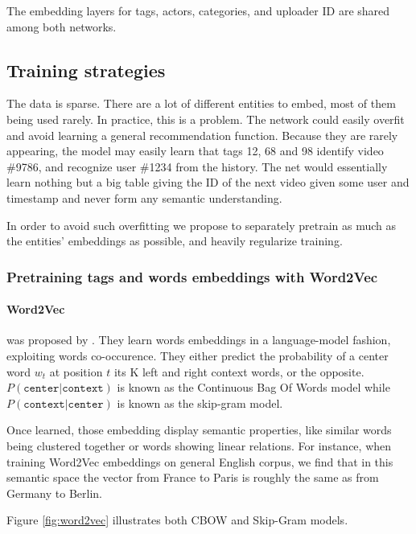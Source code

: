 The embedding layers for tags, actors, categories, and uploader ID are shared among both networks.

\subsection{Training strategies}

The data is sparse. There are a lot of different entities to embed, most of them being used rarely. In practice, this is a problem. The network could easily overfit and avoid learning a general recommendation function. Because they are rarely appearing, the model may easily learn that tags 12, 68 and 98 identify video \#9786, and recognize user \#1234 from the history. The net would essentially learn nothing but a big table giving the ID of the next video given some user and timestamp and never form any semantic understanding.

In order to avoid such overfitting we propose to separately pretrain as much as the entities' embeddings as possible, and heavily regularize training.

\subsubsection{Pretraining tags and words embeddings with Word2Vec}


\paragraph{Word2Vec} was proposed by \citet{word2vec}. They learn words embeddings in a language-model fashion, exploiting words co-occurence. They either predict the probability of a center word $w_t$ at position $t$ its K left and right context words, or the opposite. $P(\texttt{center} | \texttt{context})$ is known as the Continuous Bag Of Words model while $P(\texttt{context}|\texttt{center})$ is known as the skip-gram model.

Once learned, those embedding display semantic properties, like similar words being clustered together or words showing linear relations. For instance, when training Word2Vec embeddings on general English corpus, we find that in this semantic space the vector from France to Paris is roughly the same as from Germany to Berlin.

Figure \ref{fig:word2vec} illustrates both CBOW and Skip-Gram models.

